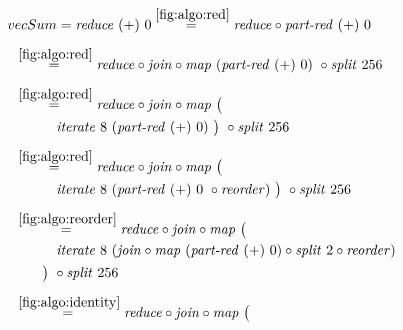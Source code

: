 \begin{figure*}[t]
\begin{align*}
  &\hspace{-1.5em}vecSum = \reduce\ (+)\ 0
%
  \overset{\ref{fig:algo:red}}{=\hspace{.2em}}
      \reduce \circ \partRed\ (+)\ 0\\[.5em]
%
  &\hspace{-2em}\quad\begin{aligned}
    &\overset{\ref{fig:algo:red}}{=\hspace{.2em}}
      \reduce \circ \join \circ \map\ (\partRed\ (+)\ 0)\ \circ \splitN\ 256
  \end{aligned}\\[.5em]
%
  &\hspace{-2em}\quad\begin{aligned}
    &\overset{\ref{fig:algo:red}}{=\hspace{.2em}}
      \reduce \circ \join \circ \map\ \big(\\
    &\qquad\quad\iterateN\ 8\ (\partRed\ (+)\ 0)\ \big)\ \circ \splitN\ 256
  \end{aligned}\\[.5em]
%
  &\hspace{-2em}\quad\begin{aligned}
    &\overset{\ref{fig:algo:red}}{=\hspace{.2em}}
      \reduce \circ \join \circ \map\ \big(\\
    &\qquad\quad\iterateN\ 8\ (\partRed\ (+)\ 0\ \circ \reorder)\ \big)\ \circ \splitN\ 256
  \end{aligned}\\[.5em]
%
  &\hspace{-2em}\quad\begin{aligned}
    &\overset{\ref{fig:algo:reorder}}{=\hspace{.2em}}
      \reduce \circ \join \circ \map\ \big(\\
    &\qquad\quad\iterateN\ 8\ (\join \circ \map\ (\partRed\ (+)\ 0) \circ \splitN\ 2\circ \reorder)\\
    &\qquad\big)\ \circ \splitN\ 256
  \end{aligned}\\[.5em]
%
  &\hspace{-2em}\quad\begin{aligned}
    &\overset{\ref{fig:algo:identity}}{=\hspace{.2em}}
      \reduce \circ \join \circ \map\ \big(\\

\end{aligned}
\end{align*}
\end{figure*}
